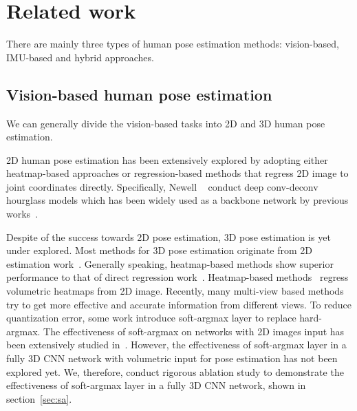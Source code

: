 \documentclass[10pt,twocolumn,letterpaper]{article}
\begin{document}
\section{Related work}
\label{sec:related}
There are mainly three types of human pose estimation methods: vision-based, IMU-based and hybrid approaches. 
\subsection{Vision-based human pose estimation}
We can generally divide the vision-based tasks into 2D and 3D human pose estimation. 


2D human pose estimation has been extensively explored by adopting either heatmap-based approaches \cite{deepercut1,papandreou2017towards,tompson2015efficient,tompson2014joint,dantone2013human,Chen2014} or regression-based methods \cite{Ke2018,wei2016convolutional,Carreira2016} that regress 2D image to joint coordinates directly. Specifically, Newell \etal~\cite{newell2016stacked} conduct deep conv-deconv hourglass models which has been widely used as a backbone network by previous works~\cite{yang2017,bulat2016,Ke2018,chu2017,huang2018}.

Despite of the success towards 2D pose estimation, 3D pose estimation is yet under explored. Most methods for 3D pose estimation originate from 2D estimation work~\cite{li2014,yasin2016,wang2014,chen2017}. Generally speaking, heatmap-based methods \cite{luvizon20182d,mehta2017,srndi2018,sun2018integral,nibali2018,Pavlakos2016,trumble2018deep} show superior performance to that of direct regression work~\cite{lin2017,martinez2017,tekin2017,trumble2017total}. Heatmap-based methods~\cite{luvizon20182d,Pavlakos2016,sun2018integral,srndi2018} regress volumetric heatmaps from 2D image. Recently, many multi-view based methods\cite{Abdolrahim2018,tome2018rethinking,PavlakosZDD17,dong2019fast,rhodin2018learning,kocabas2019self} try to get more effective and accurate information from different views. To reduce quantization error, some work\cite{sun2018integral,luvizon20182d,nibali2018,luvizon2017human,nibali2018nu} introduce soft-argmax layer to replace hard-argmax. The effectiveness of soft-argmax on networks with 2D images input has been extensively studied in~\cite{sun2018integral}. However, the effectiveness of soft-argmax layer in a fully 3D CNN network with volumetric input for pose estimation has not been explored yet. We, therefore, conduct rigorous ablation study to demonstrate the effectiveness of soft-argmax layer in a fully 3D CNN network, shown in section~\ref{sec:sa}.
\end{document}
